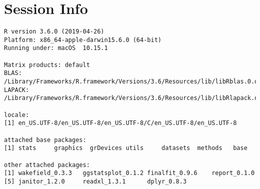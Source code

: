 \documentclass[]{article}
\begin{document}
\pagebreak

\hypertarget{session-info}{%
\section{Session Info}\label{session-info}}

\begin{verbatim}
R version 3.6.0 (2019-04-26)
Platform: x86_64-apple-darwin15.6.0 (64-bit)
Running under: macOS  10.15.1

Matrix products: default
BLAS:   /Library/Frameworks/R.framework/Versions/3.6/Resources/lib/libRblas.0.dylib
LAPACK: /Library/Frameworks/R.framework/Versions/3.6/Resources/lib/libRlapack.dylib

locale:
[1] en_US.UTF-8/en_US.UTF-8/en_US.UTF-8/C/en_US.UTF-8/en_US.UTF-8

attached base packages:
[1] stats     graphics  grDevices utils     datasets  methods   base     

other attached packages:
[1] wakefield_0.3.3   ggstatsplot_0.1.2 finalfit_0.9.6    report_0.1.0     
[5] janitor_1.2.0     readxl_1.3.1      dplyr_0.8.3      


\end{verbatim}
\end{document}
